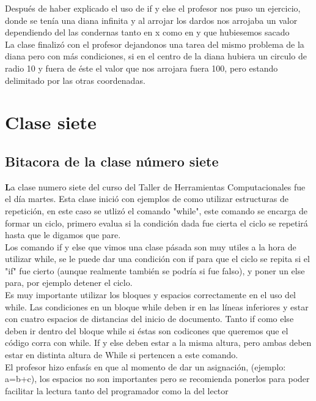 \documentclass{book}
\begin{document}
Después de haber explicado el uso de if y else el profesor nos puso un ejercicio, donde se tenía una diana infinita y al arrojar los dardos nos arrojaba un valor dependiendo del las condernas tanto en x como en y que hubiesemos sacado\\
La clase finalizó con el profesor dejandonos una tarea del mismo problema de la diana pero con más condiciones, si en el centro de la diana hubiera un circulo de radio 10 y fuera de éste el valor que nos arrojara fuera 100, pero estando delimitado por las otras coordenadas.

\chapter{Clase siete}
\section{Bitacora de la clase número siete}
\textbf La clase numero siete del curso del Taller de Herramientas Computacionales fue el día martes.
Esta clase inició con ejemplos de como utilizar estructuras de repetición, en este caso se utlizó el comando "while", este comando se encarga de formar un ciclo, primero evalua si la condición dada fue cierta el ciclo se repetirá hasta que le digamos que pare. \\
Los comando if y else que vimos una clase pásada son muy utiles a la hora de utilizar while, se le puede dar una condición con if para que el ciclo se repita si el "if" fue cierto (aunque realmente también se podría si fue falso), y poner un else para, por ejemplo detener el ciclo. \\
Es muy importante utilizar los bloques y espacios correctamente en el uso del while. Las condiciones en un bloque while deben ir en las líneas inferiores y estar con cuatro espacios de distancias del inicio de documento. Tanto if como else deben ir dentro del bloque while si éstas son codicones que queremos que el código corra con while. If y else deben estar a la misma altura, pero ambas deben estar en distinta altura de While si pertencen a este comando. \\
El profesor hizo enfasís en que al momento de dar un asignación, (ejemplo: a=b+c), los espacios no son importantes pero se recomienda ponerlos para poder facilitar la lectura tanto del programador como la del lector\\
\end{document}
